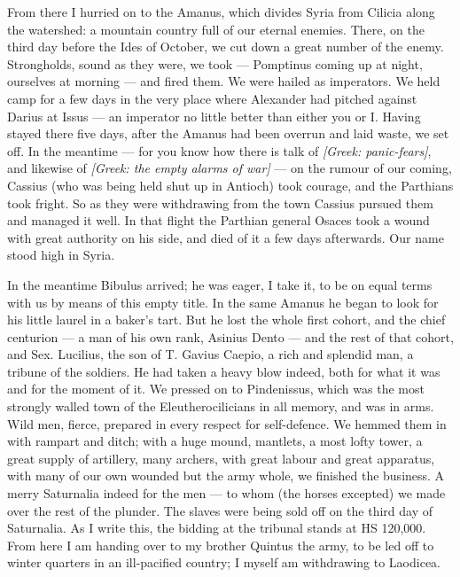  From there I hurried on to the Amanus, which divides Syria from Cilicia along the watershed: a mountain country full of our eternal enemies. There, on the third day before the Ides of October, we cut down a great number of the enemy. Strongholds, sound as they were, we took --- Pomptinus coming up at night, ourselves at morning --- and fired them. We were hailed as imperators. We held camp for a few days in the very place where Alexander had pitched against Darius at Issus --- an imperator no little better than either you or I. Having stayed there five days, after the Amanus had been overrun and laid waste, we set off. In the meantime --- for you know how there is talk of \textit{[Greek: panic-fears]}, and likewise of \textit{[Greek: the empty alarms of war]} --- on the rumour of our coming, Cassius (who was being held shut up in Antioch) took courage, and the Parthians took fright. So as they were withdrawing from the town Cassius pursued them and managed it well. In that flight the Parthian general Osaces took a wound with great authority on his side, and died of it a few days afterwards. Our name stood high in Syria.

 In the meantime Bibulus arrived; he was eager, I take it, to be on equal terms with us by means of this empty title. In the same Amanus he began to look for his little laurel in a baker's tart. But he lost the whole first cohort, and the chief centurion --- a man of his own rank, Asinius Dento --- and the rest of that cohort, and Sex. Lucilius, the son of T. Gavius Caepio, a rich and splendid man, a tribune of the soldiers. He had taken a heavy blow indeed, both for what it was and for the moment of it. We pressed on to Pindenissus, which was the most strongly walled town of the Eleutherocilicians in all memory, and was in arms. Wild men, fierce, prepared in every respect for self-defence. We hemmed them in with rampart and ditch; with a huge mound, mantlets, a most lofty tower, a great supply of artillery, many archers, with great labour and great apparatus, with many of our own wounded but the army whole, we finished the business. A merry Saturnalia indeed for the men --- to whom (the horses excepted) we made over the rest of the plunder. The slaves were being sold off on the third day of Saturnalia. As I write this, the bidding at the tribunal stands at HS 120,000. From here I am handing over to my brother Quintus the army, to be led off to winter quarters in an ill-pacified country; I myself am withdrawing to Laodicea.

